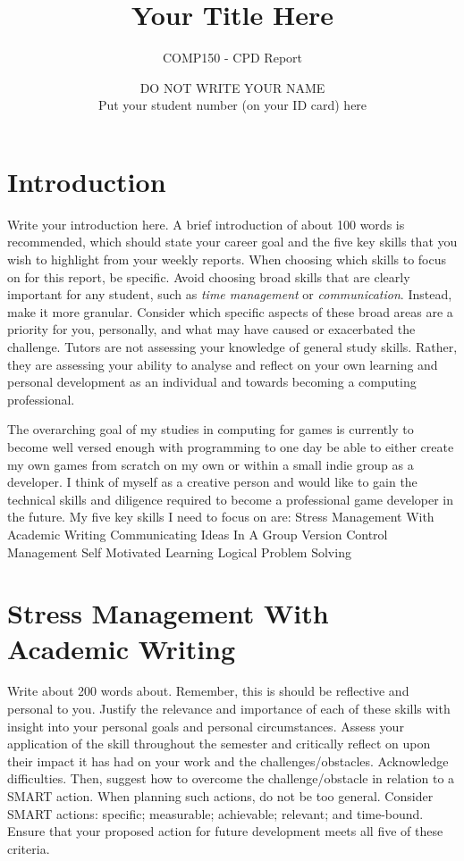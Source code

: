 \documentclass{scrartcl}
\title{Your Title Here}
\subtitle{COMP150 - CPD Report}
\author{DO NOT WRITE YOUR NAME\\Put your student number (on your ID card) here}
\begin{document}
\maketitle

\section{Introduction}

Write your introduction here. A brief introduction of about 100 words is recommended, which should state your career goal and the five key skills that you wish to highlight from your weekly reports. When choosing which skills to focus on for this report, be specific. Avoid choosing broad skills that are clearly important for any student, such as \textit{time management} or \textit{communication}. Instead, make it more granular. Consider which specific aspects of these broad areas are a priority for you, personally, and what may have caused or exacerbated the challenge. Tutors are not assessing your knowledge of general study skills. Rather, they are assessing your ability to analyse and reflect on your own learning and personal development as an individual and towards becoming a computing professional.

The overarching goal of my studies in computing for games is currently to become well versed enough with programming to one day be able to either create my own games from scratch on my own or within a small indie group as a developer. I think of myself as a creative person and would like to gain the technical skills and diligence required to become a professional game developer in the future. My five key skills I need to focus on are:
Stress Management With Academic Writing
Communicating Ideas In A Group
Version Control Management
Self Motivated Learning
Logical Problem Solving


\section{Stress Management With Academic Writing}

Write about 200 words about. Remember, this is should be reflective and personal to you. Justify the relevance and importance of each of these skills with insight into your personal goals and personal circumstances. Assess your application of the skill throughout the semester and critically reflect on upon their impact it has had on your work and the challenges/obstacles. Acknowledge difficulties. Then, suggest how to overcome the challenge/obstacle in relation to a SMART action. When planning such actions, do not be too general. Consider SMART actions:
specific; measurable; achievable; relevant; and time-bound. Ensure that your proposed action for future development meets all five of these criteria.
\end{document}
